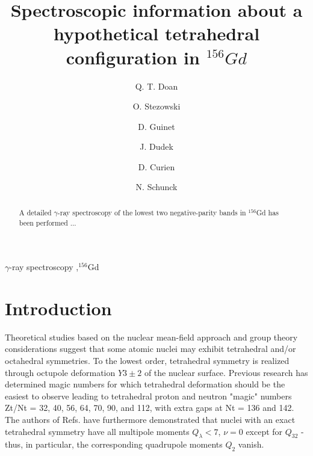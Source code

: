 \documentclass[final, 5p,12pt]{elsarticle}
\begin{document}
\begin{frontmatter}

\title{Spectroscopic information about a hypothetical tetrahedral configuration in $^{156}Gd$}

\author[ipnl]{Q. T. Doan}
\author[ipnl,ucbl]{O. Stezowski}
\author[ipnl,ucbl]{D. Guinet}
\author[iphc]{J. Dudek}
\author[iphc]{D. Curien}
\author[pan]{N. Schunck}

\address[ipnl]{Institut de Physique Nucl\'eaire de Lyon, France}

\address[ucbl]{Universit\'e de Lyon, Universit\'e Lyon 1, Lyon, France}

\address[iphc]{Departement de Recherches Subatomiques, Institut Pluridisciplinaire Hubert Curien, Strasbourg, France}

\address[pan]{Institute of Nuclear Physics PAN, PL-31-342 Krak\'ow, Poland}

 

\begin{abstract}
A detailed $\gamma$-ray spectroscopy of the lowest two negative-parity bands in $^{156}$Gd has been performed ...
\end{abstract}

\begin{keyword}
$\gamma$-ray spectroscopy \sep $^{156}$Gd
\end{keyword}

\end{frontmatter}



\section{Introduction}
\label{sec:intro}

Theoretical studies based on the nuclear mean-field approach
and group theory considerations suggest \cite{bib_dudek2006, bib_schunk2006} that
some atomic nuclei may exhibit tetrahedral and/or octahedral
symmetries. To the lowest order, tetrahedral symmetry is
realized through octupole deformation $Y3\pm 2$ of the nuclear
surface. Previous research\cite{bib_dudek2002} has determined magic numbers for which tetrahedral deformation should be the easiest to
observe leading to tetrahedral proton and neutron "magic"
numbers Zt/Nt = 32, 40, 56, 64, 70, 90, and 112, with extra
gaps at Nt = 136 and 142. The authors of Refs. \cite{bib_dudek2006, bib_schunk2006, bib_dudek2002} have
furthermore demonstrated that nuclei with an exact tetrahedral
symmetry have all multipole moments $Q_\lambda < 7$, $\nu = 0$ except for $Q_{32}$ - thus, in particular, the corresponding quadrupole
moments $Q_2$ vanish.
\end{document}
